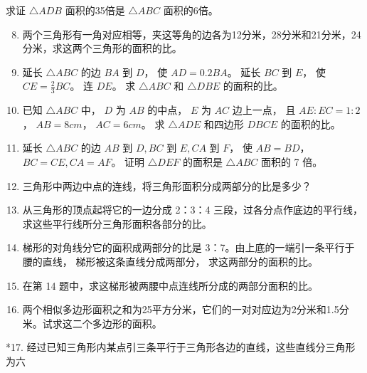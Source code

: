 求证 \(\triangle ADB\) 面积的35倍是 \(\triangle ABC\) 面积的6倍。

\begin{enumerate}
\setcounter{enumi}{7}
\item
  两个三角形有一角对应相等，夹这等角的边各为12分米，28分米和21分米，24分米，求这两个三角形的面积的比。
\item
  延长 \(\triangle ABC\) 的边 \(BA\) 到 \(D\)， 使 \(AD = 0.2BA\)。 延长
  \(BC\) 到 \(E\)， 使 \(CE = \frac{2}{3} BC\)。 连 \(DE\)。 求
  \(\triangle ABC\) 和 \(\triangle DBE\) 的面积的比。
\item
  已知 \(\triangle ABC\) 中， \(D\) 为 \(AB\) 的中点， \(E\) 为 \(AC\)
  边上一点， 且 \(AE: EC = 1:2\)， \(AB = 8cm\)， \(AC = 6cm\)。 求
  \(\triangle ADE\) 和四边形 \(DBCE\) 的面积的比。
\item
  延长 \(\triangle ABC\) 的边 \(AB\) 到 \(D, BC\) 到 \(E, CA\) 到
  \(F\)， 使 \(AB = BD\)， \(BC = CE, CA = AF\)。 证明 \(\triangle DEF\)
  的面积是 \(\triangle ABC\) 面积的 7 倍。
\item
  三角形中两边中点的连线，将三角形面积分成两部分的比是多少？
\item
  从三角形的顶点起将它的一边分成 2：3：4
  三段，过各分点作底边的平行线，求这些平行线所分三角形面积各部分的比。
\item
  梯形的对角线分它的面积成两部分的比是
  3：7。由上底的一端引一条平行于腰的直线， 梯形被这条直线分成两部分，
  求这两部分的面积的比。
\item
  在第 14 题中，求这梯形被两腰中点连线所分成的两部分面积的比。
\item
  两个相似多边形面积之和为25平方分米，它们的一对对应边为2分米和1.5分米。试求这二个多边形的面积。
\end{enumerate}

*17.
经过已知三角形内某点引三条平行于三角形各边的直线，这些直线分三角形为六

